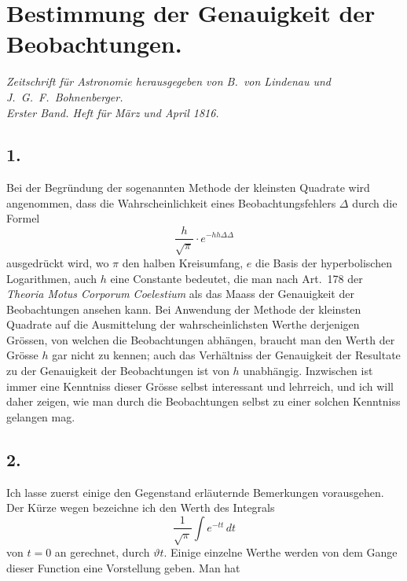 \documentclass[12pt,a4paper]{article}
\begin{document}
\newpage

\section*{Bestimmung der Genauigkeit der Beobachtungen.}

\begin{center}
\textit{Zeitschrift f\"ur Astronomie herausgegeben von B.\ von Lindenau und J.\ G.\ F.\ Bohnenberger.\\Erster Band. Heft f\"ur M\"arz und April 1816.}
\end{center}

\subsection*{1.}

Bei der Begr\"undung der sogenannten Methode der kleinsten Quadrate wird angenommen, dass die Wahrscheinlichkeit eines Beobachtungsfehlers $\Delta$ durch die Formel
\[
\frac{h}{\sqrt{\pi}} \cdot e^{-hh\Delta\Delta}
\]
ausgedr\"uckt wird, wo $\pi$ den halben Kreisumfang, $e$ die Basis der hyperbolischen Logarithmen, auch $h$ eine Constante bedeutet, die man nach Art.\ 178 der \textit{Theoria Motus Corporum Coelestium} als das Maass der Genauigkeit der Beobachtungen ansehen kann. Bei Anwendung der Methode der kleinsten Quadrate auf die Ausmittelung der wahrscheinlichsten Werthe derjenigen Gr\"ossen, von welchen die Beobachtungen abh\"angen, braucht man den Werth der Gr\"osse $h$ gar nicht zu kennen; auch das Verh\"altniss der Genauigkeit der Resultate zu der Genauigkeit der Beobachtungen ist von $h$ unabh\"angig. Inzwischen ist immer eine Kenntniss dieser Gr\"osse selbst interessant und lehrreich, und ich will daher zeigen, wie man durch die Beobachtungen selbst zu einer solchen Kenntniss gelangen mag.

\subsection*{2.}

Ich lasse zuerst einige den Gegenstand erl\"auternde Bemerkungen vorausgehen. Der K\"urze wegen bezeichne ich den Werth des Integrals
\[
\frac{1}{\sqrt{\pi}} \int e^{-tt} \, dt
\]
von $t = 0$ an gerechnet, durch $\vartheta t$. Einige einzelne Werthe werden von dem Gange dieser Function eine Vorstellung geben. Man hat
\end{document}
